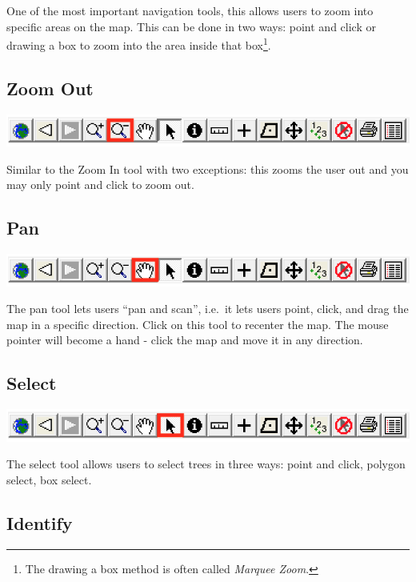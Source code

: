 \documentclass[]{book}
\let\rmarkdownfootnote\footnote%
\def\footnote{\protect\rmarkdownfootnote}
\begin{document}
One of the most important navigation tools, this allows users to zoom
into specific areas on the map. This can be done in two ways: point and
click or drawing a box to zoom into the area inside that box\footnote{The
  drawing a box method is often called \emph{Marquee Zoom}.}.

\hypertarget{zoom-out}{%
\subsection{Zoom Out}\label{zoom-out}}

\includegraphics[width=10.36in]{images/toolbar-zoom-out}

Similar to the Zoom In tool with two exceptions: this zooms the user out
and you may only point and click to zoom out.

\hypertarget{pan}{%
\subsection{Pan}\label{pan}}

\includegraphics[width=10.36in]{images/toolbar-pan}

The pan tool lets users ``pan and scan'', i.e.~it lets users point,
click, and drag the map in a specific direction. Click on this tool to
recenter the map. The mouse pointer will become a hand - click the map
and move it in any direction.

\hypertarget{select}{%
\subsection{Select}\label{select}}

\includegraphics[width=10.36in]{images/toolbar-select}

The select tool allows users to select trees in three ways: point and
click, polygon select, box select.

\hypertarget{identify}{%
\subsection{Identify}\label{identify}}
\end{document}
